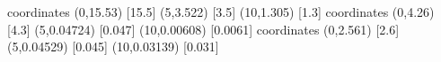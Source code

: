 coordinates {(0,15.53) [15.5] (5,3.522) [3.5] (10,1.305) [1.3]}
coordinates {(0,4.26) [4.3] (5,0.04724) [0.047] (10,0.00608) [0.0061]}
coordinates {(0,2.561) [2.6] (5,0.04529) [0.045] (10,0.03139) [0.031]}
